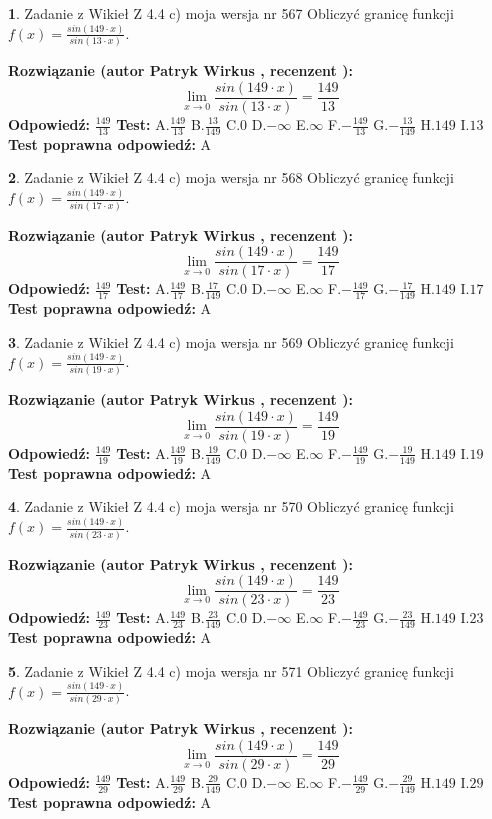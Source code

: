 \documentclass[12pt, a4paper]{article}
\theoremstyle{definition} %
\newtheorem{zad}{}
\newcommand{\zadStart}[1]{\begin{zad}#1\newline}
\newcommand{\zadStop}{\end{zad}}
\newcommand{\rozwStart}[2]{\noindent \textbf{Rozwiązanie (autor #1 , recenzent #2): }\newline}
\newcommand{\rozwStop}{\newline}
\newcommand{\odpStart}{\noindent \textbf{Odpowiedź:}\newline}
\newcommand{\odpStop}{\newline}
\newcommand{\testStart}{\noindent \textbf{Test:}\newline}
\newcommand{\testStop}{\newline}
\newcommand{\kluczStart}{\noindent \textbf{Test poprawna odpowiedź:}\newline}
\newcommand{\kluczStop}{\newline}
\begin{document}
\zadStart{Zadanie z Wikieł Z 4.4 c) moja wersja nr 567}
Obliczyć granicę funkcji $f(x)=\frac{sin(149\cdot x)}{sin(13\cdot x)}$.
\zadStop
\rozwStart{Patryk Wirkus}{}
$$\lim\limits_{x\to 0}\frac{sin(149\cdot x)}{sin(13\cdot x)}=
\frac{149}{13}$$
\rozwStop
\odpStart
$\frac{149}{13}$
\odpStop
\testStart
A.$\frac{149}{13}$
B.$\frac{13}{149}$
C.$0$
D.$-\infty$
E.$\infty$
F.$-\frac{149}{13}$
G.$-\frac{13}{149}$
H.$149$
I.$13$
\testStop
\kluczStart
A
\kluczStop



\zadStart{Zadanie z Wikieł Z 4.4 c) moja wersja nr 568}
Obliczyć granicę funkcji $f(x)=\frac{sin(149\cdot x)}{sin(17\cdot x)}$.
\zadStop
\rozwStart{Patryk Wirkus}{}
$$\lim\limits_{x\to 0}\frac{sin(149\cdot x)}{sin(17\cdot x)}=
\frac{149}{17}$$
\rozwStop
\odpStart
$\frac{149}{17}$
\odpStop
\testStart
A.$\frac{149}{17}$
B.$\frac{17}{149}$
C.$0$
D.$-\infty$
E.$\infty$
F.$-\frac{149}{17}$
G.$-\frac{17}{149}$
H.$149$
I.$17$
\testStop
\kluczStart
A
\kluczStop



\zadStart{Zadanie z Wikieł Z 4.4 c) moja wersja nr 569}
Obliczyć granicę funkcji $f(x)=\frac{sin(149\cdot x)}{sin(19\cdot x)}$.
\zadStop
\rozwStart{Patryk Wirkus}{}
$$\lim\limits_{x\to 0}\frac{sin(149\cdot x)}{sin(19\cdot x)}=
\frac{149}{19}$$
\rozwStop
\odpStart
$\frac{149}{19}$
\odpStop
\testStart
A.$\frac{149}{19}$
B.$\frac{19}{149}$
C.$0$
D.$-\infty$
E.$\infty$
F.$-\frac{149}{19}$
G.$-\frac{19}{149}$
H.$149$
I.$19$
\testStop
\kluczStart
A
\kluczStop



\zadStart{Zadanie z Wikieł Z 4.4 c) moja wersja nr 570}
Obliczyć granicę funkcji $f(x)=\frac{sin(149\cdot x)}{sin(23\cdot x)}$.
\zadStop
\rozwStart{Patryk Wirkus}{}
$$\lim\limits_{x\to 0}\frac{sin(149\cdot x)}{sin(23\cdot x)}=
\frac{149}{23}$$
\rozwStop
\odpStart
$\frac{149}{23}$
\odpStop
\testStart
A.$\frac{149}{23}$
B.$\frac{23}{149}$
C.$0$
D.$-\infty$
E.$\infty$
F.$-\frac{149}{23}$
G.$-\frac{23}{149}$
H.$149$
I.$23$
\testStop
\kluczStart
A
\kluczStop



\zadStart{Zadanie z Wikieł Z 4.4 c) moja wersja nr 571}
Obliczyć granicę funkcji $f(x)=\frac{sin(149\cdot x)}{sin(29\cdot x)}$.
\zadStop
\rozwStart{Patryk Wirkus}{}
$$\lim\limits_{x\to 0}\frac{sin(149\cdot x)}{sin(29\cdot x)}=
\frac{149}{29}$$
\rozwStop
\odpStart
$\frac{149}{29}$
\odpStop
\testStart
A.$\frac{149}{29}$
B.$\frac{29}{149}$
C.$0$
D.$-\infty$
E.$\infty$
F.$-\frac{149}{29}$
G.$-\frac{29}{149}$
H.$149$
I.$29$
\testStop
\kluczStart
A
\kluczStop
\end{document}
